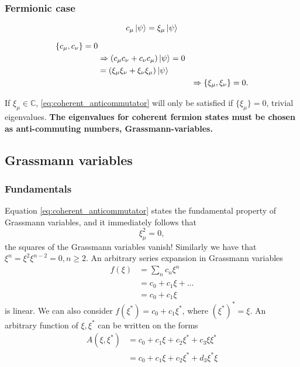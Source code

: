 \subsubsection{Fermionic case}

\begin{equation}
c_\mu \ket{\psi} = \xi_\mu\ket{\psi}
\end{equation}

\begin{align}
\{c_\mu, c_\nu\} = 0 && \nonumber \\
&\Rightarrow\left(c_\mu c_\nu + c_\nu c_\mu\right)\ket{\psi} = 0 &\nonumber \\
&=\left(\xi_\mu\xi_\nu + \xi_\nu\xi_\mu\right)\ket{\psi} &\nonumber \\
&&\Rightarrow \{\xi_\mu,\xi_\nu\} = 0.\label{eq:coherent_anticommutator}
\end{align}

If $\xi_\mu\in\mathbb{C}$, \eqref{eq:coherent_anticommutator} will only be satisfied if $\{\xi_\mu\} = 0$, trivial eigenvalues. \textbf{The eigenvalues for coherent fermion states must be chosen as anti-commuting numbers, Grassmann-variables.}

\subsection{Grassmann variables}
\subsubsection{Fundamentals}
	
Equation \eqref{eq:coherent_anticommutator} states the fundamental property of Grassmann variables, and it immediately follows that 
\begin{equation}
\xi_\mu^2 = 0,
\end{equation}
the squares of the Grassmann variables vanish!
Similarly we have that $\xi^n = \xi^2\xi^{n-2} = 0, n \ge 2$.
An arbitrary series expansion in Grassmann variables
\begin{align}
f(\xi) &= \sum_nc_n\xi^n \nonumber \\
&=c_0 + c_1\xi + \dots \nonumber\\
&= c_0 + c_1\xi
\end{align}
is linear. We can also consider $f(\xi^*) = c_0 + c_1\xi^*$, where $\left(\xi^*\right)^* = \xi$.
An arbitrary function of $\xi, \xi^*$ can be written on the forms
\begin{align}
\label{eq:grassmann_function}
A\left(\xi, \xi^*\right) &= c_0 + c_1\xi + c_2\xi^*+c_3\xi\xi^* \\
&= c_0 + c_1\xi + c_2\xi^*+d_3\xi^*\xi
\end{align}

